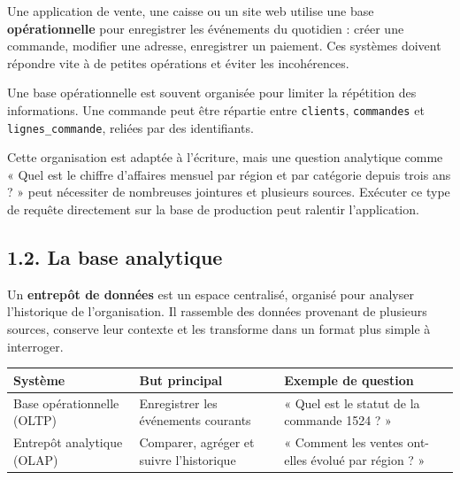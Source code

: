 \documentclass[
  french,
  letterpaper,
  open=any]{scrbook}
\newcounter{none} %
\theoremstyle{definition}
\theoremstyle{definition}
\theoremstyle{remark}
\begin{document}
Une application de vente, une caisse ou un site web utilise une base
\textbf{opérationnelle} pour enregistrer les événements du quotidien :
créer une commande, modifier une adresse, enregistrer un paiement. Ces
systèmes doivent répondre vite à de petites opérations et éviter les
incohérences.

Une base opérationnelle est souvent organisée pour limiter la répétition
des informations. Une commande peut être répartie entre
\texttt{clients}, \texttt{commandes} et \texttt{lignes\_commande},
reliées par des identifiants.

Cette organisation est adaptée à l'écriture, mais une question
analytique comme « Quel est le chiffre d'affaires mensuel par région et
par catégorie depuis trois ans ? » peut nécessiter de nombreuses
jointures et plusieurs sources. Exécuter ce type de requête directement
sur la base de production peut ralentir l'application.

\subsection{1.2. La base analytique}\label{la-base-analytique}

Un \textbf{entrepôt de données} est un espace centralisé, organisé pour
analyser l'historique de l'organisation. Il rassemble des données
provenant de plusieurs sources, conserve leur contexte et les transforme
dans un format plus simple à interroger.

{\def\LTcaptype{none} %
\begin{longtable}[]{@{}
  >{\raggedright\arraybackslash}p{}
  >{\raggedright\arraybackslash}p{}
  >{\raggedright\arraybackslash}p{}@{}}
\toprule\noalign{}
\begin{minipage}[b]{\linewidth}\raggedright
Système
\end{minipage} & \begin{minipage}[b]{\linewidth}\raggedright
But principal
\end{minipage} & \begin{minipage}[b]{\linewidth}\raggedright
Exemple de question
\end{minipage} \\
\midrule\noalign{}
\endhead
\bottomrule\noalign{}
\endlastfoot
Base opérationnelle (OLTP) & Enregistrer les événements courants & «
Quel est le statut de la commande 1524 ? » \\
Entrepôt analytique (OLAP) & Comparer, agréger et suivre l'historique &
« Comment les ventes ont-elles évolué par région ? » \\
\end{longtable}
}
\end{document}
